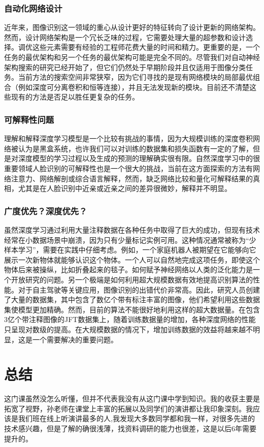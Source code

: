 \documentclass{article}
\begin{document}
\subsubsection{自动化网络设计} 
近年来，图像识别这一领域的重心从设计更好的特征转向了设计更新的网络架构。然而，设计网络架构是一个冗长乏味的过程，它需要处理大量的超参数和设计选择。调优这些元素需要有经验的工程师花费大量的时间和精力。更重要的是，一个任务的最优架构和另一个任务的最优架构可能是完全不同的。尽管我们对自动神经架构搜索的研究已经开始了，但它们仍然处于早期阶段并且仅适用于图像分类任务。当前方法的搜索空间非常狭窄，因为它们寻找的是现有网络模块的局部最优组合（例如深度可分离卷积和恒等连接），并且无法发现新的模块。目前还不清楚这些现有的方法是否足以胜任更复杂的任务。
\subsubsection{可解释性问题}
理解和解释深度学习模型是一个比较有挑战的事情，因为大规模训练的深度卷积网络被认为是黑盒系统，也许我们可以对训练的数据集和损失函数有一定的了解，但是对深度模型的学习过程以及生成的预测的理解确实很有限。自然深度学习中的很重要领域人脸识别的可解释性也是一个很大的挑战，当前在这方面探索的方法有网络注意力、网络解剖或综合语言解释，然而，缺乏网络比较和量化可解释结果的真相，尤其是在人脸识别中近亲或近亲之间的差异很微妙，解释并不明显。
\subsubsection{广度优先？深度优先？}
虽然深度学习通过利用大量注释数据在各种任务中取得了巨大的成功，但现有技术经常在小数据场景中崩溃，因为只有少量标记实例可用。这种情况通常被称为“少样本学习”，需要在实践中仔细考虑。例如，一个家庭机器人被期望在它能够向它展示一次新物体就能够认识这个物体。一个人可以自然地完成这项任务，即使这个物体后来被操纵，比如折叠起来的毯子。如何赋予神经网络以人类的泛化能力是一个开放研究的问题。另一个极端是如何利用超大规模数据有效地提高识别算法的性能。对于自主驾驶等关键应用，图像识别的出错代价非常高。因此，研究人员创建了大量的数据集，其中包含了数亿个带有标注丰富的图像，他们希望利用这些数据集使模型更加精确。然而，目前的算法不能很好地利用这样的超大数据量。在包含3亿个带注释图像的JFT数据集上，随着训练数据量的增加，各种深度网络的性能只呈现对数级的提高。在大规模数据的情况下，增加训练数据的效益将越来越不明显，这是一个需要解决的重要问题。
\section{总结}
这门课虽然没怎么听懂，但并不代表我没有从这门课中学到知识。我的收获主要是拓宽了视野，孙老师在课堂上丰富的拓展以及同学们的演讲都让我印象深刻。我应该是我们班在线上听演讲最多的人,我发现大多数同学都和我一样，对很多先进的技术感兴趣，但是了解的确很浅薄，找资料调研的能力也很差，这是以后6年需要提升的。\par 
\end{document}
